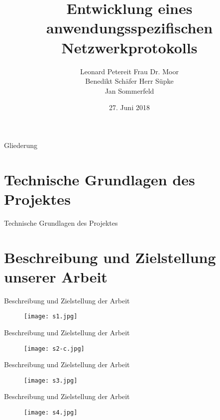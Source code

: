 \documentclass{beamer}
\title[]{Entwicklung eines anwendungsspezifischen Netzwerkprotokolls}
\author{Leonard Petereit\hfill \hspace{0.5cm} Frau Dr. Moor\\ Benedikt Schäfer\hfill \hspace{1cm} Herr Süpke \\ Jan Sommerfeld \hspace{4.25cm} }
\institute{Albert-Schweitzer Gymnasium Erfurt - Spezialschulteil}
\date{27. Juni 2018}
\begin{document}
\begin{frame}
	
  \titlepage
\end{frame}

\begin{frame}{Gliederung}

  \tableofcontents
\end{frame}




\section{Technische Grundlagen des Projektes}

\begin{frame}{Technische Grundlagen des Projektes}

\end{frame}

\section{Beschreibung und Zielstellung unserer Arbeit}

\begin{frame}{Beschreibung und Zielstellung der Arbeit}
\begin{figure}
\texttt{[image: s1.jpg]}

\end{figure}
\end{frame}

\begin{frame}{Beschreibung und Zielstellung der Arbeit}
\begin{figure}
\texttt{[image: s2-c.jpg]}
\end{figure}
\end{frame}

\begin{frame}{Beschreibung und Zielstellung der Arbeit}
\begin{figure}
\texttt{[image: s3.jpg]}
\end{figure}
\end{frame}

\begin{frame}{Beschreibung und Zielstellung der Arbeit}
\begin{figure}
\texttt{[image: s4.jpg]}
\end{figure}
\end{frame}
\end{document}
